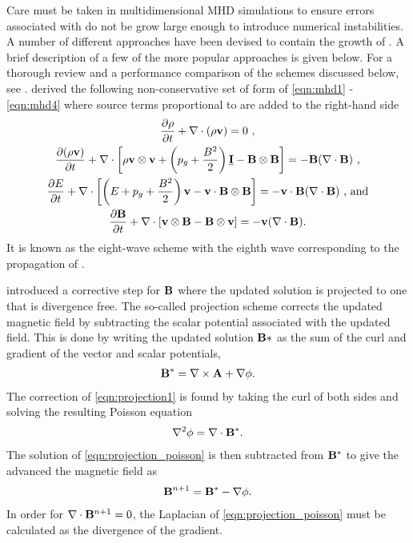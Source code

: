 Care must be taken in multidimensional MHD simulations to ensure errors associated with  do not be grow large enough to introduce numerical instabilities.  A number of different approaches have been devised to contain the growth of .  A brief description of a few of the more popular approaches is given below.  For a thorough review and a performance comparison of the schemes discussed below, see \citep{Toth:2000}.  \citet{Powell:1999} derived the following non-conservative set of form of \eqref{eqn:mhd1} - \eqref{eqn:mhd4} where source terms proportional to  are added to the right-hand side
\begin{gather}
\label{eqn:8wave1} \frac{\partial \rho}{\partial t} + \mathbf{\nabla} \cdot \left(\rho\mathbf{v}\right) = 0 \text{ ,} \\
\label{eqn:8wave2} \frac{\partial (\rho \mathbf{v})}{\partial t} + \mathbf{\nabla} \cdot \left[ \rho\mathbf{v} \otimes \mathbf{v} + \left( p_g + \frac{B^2}{2}\right)\underline{\mathbf{I}} - \mathbf{B} \otimes \mathbf{B}\right]  = -\mathbf{B}(\mathbf{\nabla} \cdot \mathbf{B}) \text{ ,}\\
\label{eqn:8wave3} \frac{\partial E}{\partial t} + \mathbf{\nabla} \cdot \left[ \left(E + p_g + \frac{B^2}{2}\right)\mathbf{v} - \mathbf{v} \cdot \mathbf{B} \otimes \mathbf{B}\right]  = -\mathbf{v}\cdot\mathbf{B}(\mathbf{\nabla} \cdot \mathbf{B}) \text{ , and} \\
\label{eqn:8wave4} \frac{\partial \mathbf{B}}{\partial t} + \mathbf{\nabla} \cdot \left[ \mathbf{v} \otimes \mathbf{B} - \mathbf{B} \otimes \mathbf{v}\right]  = -\mathbf{v}(\mathbf{\nabla} \cdot \mathbf{B}) \text{.}
\end{gather}
It is known as the eight-wave scheme with the eighth wave corresponding to the propagation of .  

\citet{Brackbill:1980} introduced a corrective step for $\mathbf{B}$ where the updated solution is projected to one that is  divergence free.  The so-called projection scheme corrects the updated magnetic field by subtracting the scalar potential associated with the updated field.  This is done by writing the updated solution $\mathbf{B*}$ as the sum of the curl and gradient of the vector and scalar potentials,
\begin{gather}
\label{eqn:projection1}
\mathbf{B}^* = \mathbf{\nabla} \times \mathbf{A} + \mathbf{\nabla}\phi.
\end{gather}
The correction of \eqref{eqn:projection1} is found by taking the curl of both sides and solving the resulting Poisson equation
\begin{gather}
\label{eqn:projection_poisson}
\mathbf{\nabla}^2\phi = \mathbf{\nabla} \cdot \mathbf{B^*}.
\end{gather} 
The solution of \eqref{eqn:projection_poisson} is then subtracted from $\mathbf{B}^*$ to give the advanced the magnetic field as
\begin{gather}
\label{eqn:projection2}
\mathbf{B}^{n+1} = \mathbf{B}^* - \mathbf{\nabla}\phi.
\end{gather} 
In order for $\mathbf{\nabla} \cdot \mathbf{B}^{n+1} = 0$, the Laplacian of \eqref{eqn:projection_poisson} must be calculated as the divergence of the gradient.

